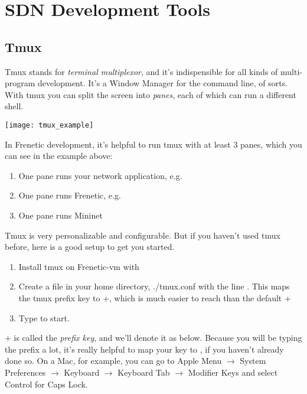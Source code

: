 
\chapter{SDN Development Tools}

\section{Tmux}

Tmux stands for \emph{terminal multiplexor}, and it's indispensible for all kinds of multi-program development.
It's a Window Manager for the command line, of sorts.
With tmux you can split the screen into \emph{panes}, each of which can run a different shell.

\texttt{[image: tmux\_example]}

In Frenetic development, it's helpful to run tmux with at least 3 panes, which you can see in the example above:

\begin{enumerate}
\item One pane runs your network application, e.g. 
\item One pane runs Frenetic, e.g. 
\item One pane runs Mininet
\end{enumerate}

Tmux is very personalizable and configurable.  
But if you haven't used tmux before, here is a good setup to get you started.

\begin{enumerate}
\item Install tmux on Frenetic-vm with 
\item Create a file in your home directory, ./tmux.conf with the line .  
This maps the tmux prefix key to \Ctrl+, which is much easier to reach than the default 
\Ctrl+
\item Type  to start.
\end{enumerate}

\Ctrl+ is called the \emph{prefix key}, and we'll denote it as  below. 
Because you will be typing the prefix a lot, it's really helpful to map your  key to \Ctrl, if
you haven't already done so.  
On a Mac, for example, you can go to Apple Menu $\rightarrow$ System Preferences $\rightarrow$ Keyboard 
$\rightarrow$ Keyboard Tab $\rightarrow$ Modifier Keys and select Control for Caps Lock.

